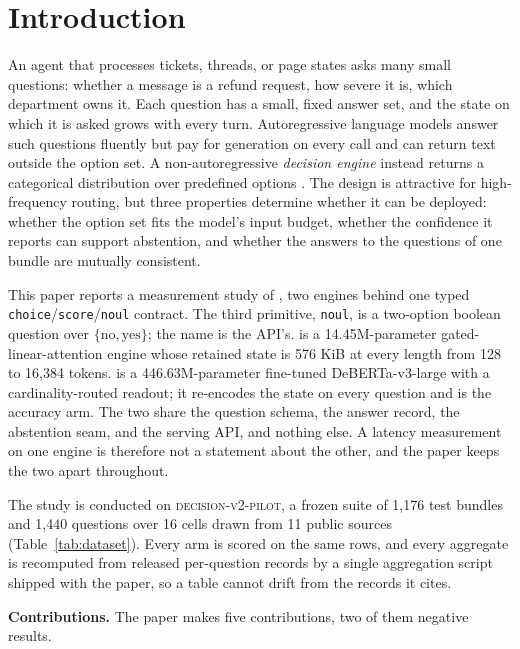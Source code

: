 \section{Introduction}
\label{sec:intro}

An agent that processes tickets, threads, or page states asks many small questions: whether a
message is a refund request, how severe it is, which department owns it. Each question has a
small, fixed answer set, and the state on which it is asked grows with every turn.
Autoregressive language models answer such questions fluently but pay for generation on every
call and can return text outside the option set. A non-autoregressive \emph{decision engine}
instead returns a categorical distribution over predefined options
\citep{li2026jev,duan2026gdm}. The design is attractive for high-frequency routing, but three
properties determine whether it can be deployed: whether the option set fits the model's input
budget, whether the confidence it reports can support abstention, and whether the answers to the
questions of one bundle are mutually consistent.

This paper reports a measurement study of \myna, two engines behind one typed
\texttt{choice}/\texttt{score}/\texttt{noul} contract. The third primitive, \texttt{noul}, is a two-option boolean question over $\{\text{no},\text{yes}\}$; the name is the API's. \stream{} is a 14.45M-parameter
gated-linear-attention engine whose retained state is 576 KiB at every length from 128 to
16{,}384 tokens. \vsix{} is a 446.63M-parameter fine-tuned DeBERTa-v3-large with a
cardinality-routed readout; it re-encodes the state on every question and is the accuracy arm.
The two share the question schema, the answer record, the abstention seam, and the serving API,
and nothing else. A latency measurement on one engine is therefore not a statement about the
other, and the paper keeps the two apart throughout.

The study is conducted on \textsc{decision-v2-pilot}, a frozen suite of 1{,}176 test bundles and
1{,}440 questions over 16 cells drawn from 11 public sources (Table~\ref{tab:dataset}). Every arm
is scored on the same rows, and every aggregate is recomputed from released per-question records
by a single aggregation script shipped with the paper, so a table cannot drift from the records
it cites.

\textbf{Contributions.} The paper makes five contributions, two of them negative results.

